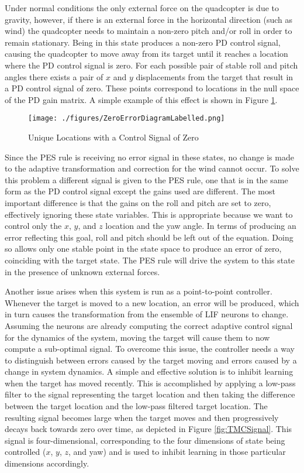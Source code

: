 \documentclass[letterpaper, 10 pt, conference]{ieeeconf}  %
\begin{document}
Under normal conditions the only external force on the quadcopter is due to gravity, however, if there is an external force in the horizontal direction (such as wind) the quadcopter needs to maintain a non-zero pitch and/or roll in order to remain stationary.
Being in this state produces a non-zero PD control signal, causing the quadcopter to move away from its target until it reaches a location where the PD control signal is zero.
For each possible pair of stable roll and pitch angles there exists a pair of $x$ and $y$ displacements from the target that result in a PD control signal of zero.
These points correspond to locations in the null space of the PD gain matrix.
A simple example of this effect is shown in Figure \ref{fig:zeroError}.

\begin{figure}
\centering
\texttt{[image: ./figures/ZeroErrorDiagramLabelled.png]}
\caption{Unique Locations with a Control Signal of Zero}
\label{fig:zeroError}
\end{figure}

Since the PES rule is receiving no error signal in these states, no change is made to the adaptive transformation and correction for the wind cannot occur.
To solve this problem a different signal is given to the PES rule, one that is in the same form as the PD control signal except the gains used are different.
The most important difference is that the gains on the roll and pitch are set to zero, effectively ignoring these state variables.
This is appropriate because we want to control only the $x$, $y$, and $z$ location and the yaw angle.
In terms of producing an error reflecting this goal, roll and pitch should be left out of the equation.
Doing so allows only one stable point in the state space to produce an error of zero, coinciding with the target state.
The PES rule will drive the system to this state in the presence of unknown external forces.

Another issue arises when this system is run as a point-to-point controller.
Whenever the target is moved to a new location, an error will be produced, which in turn causes the transformation from the ensemble of LIF neurons to change.
Assuming the neurons are already computing the correct adaptive control signal for the dynamics of the system, moving the target will cause them to now compute a sub-optimal signal.
To overcome this issue, the controller needs a way to distinguish between errors caused by the target moving and errors caused by a change in system dynamics.
A simple and effective solution is to inhibit learning when the target has moved recently.
This is accomplished by applying a low-pass filter to the signal representing the target location and then taking the difference between the target location and the low-pass filtered target location.
The resulting signal becomes large when the target moves and then progressively decays back towards zero over time, as depicted in Figure \ref{fig:TMCSignal}.
This signal is four-dimensional, corresponding to the four dimensions of state being controlled ($x$, $y$, $z$, and yaw) and is used to inhibit learning in those particular dimensions accordingly.
\end{document}
